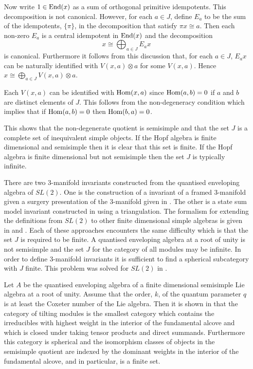 Now write $1\in\operatorname{End} (x)$ as a sum of orthogonal primitive idempotents.
This decomposition is not canonical. However, for each $a\in J$, define
$E_a$ to be the sum of the idempotents, $\{\pi\}$, in the decomposition
that satisfy $\pi x\cong a$. Then each non-zero $E_a$ is a central
idempotent in $\operatorname{End} (x)$ and the decomposition
$$x\cong\bigoplus_{a\in J}E_ax$$
is canonical. Furthermore it follows from this discussion that, for each
$a\in J$, $E_ax$ can be naturally identified with $V(x,a)\otimes a$ for
some $V(x,a)$. Hence $x\cong\bigoplus_{a\in J}V(x,a)\otimes a$. 

Each $V(x,a)$ can be identified with $\operatorname{Hom} (x,a)$ since $\operatorname{Hom} (a,b)=0$ 
if $a$ and $b$ are distinct elements of $J$. This follows from the 
non-degeneracy condition which implies that if $\operatorname{Hom}(a,b)=0$ then 
$\operatorname{Hom}(b,a)=0$.
\enddemo

This shows that the non-degenerate quotient is semisimple and that the set
$J$ is a complete set of inequivalent simple objects. If the Hopf algebra
is finite dimensional and semisimple then it is clear that this set is
finite. If the Hopf algebra is finite dimensional but not semisimple then
the set $J$ is typically infinite.

There are two 3-manifold invariants constructed from the quantised
enveloping algebra of $SL(2)$. One is the construction of a invariant
of a framed 3-manifold given a surgery presentation of the 3-manifold
given in \cite{Reshetikhin and Turaev  1991}. The other is a state sum model invariant
constructed in \cite{Turaev and Viro  1992}  using a triangulation. The formalism for
extending the definitions from $SL(2)$ to other finite dimensional simple
algebras is given in \cite{Turaev  1992}  and \cite{Barrett and Westbury 1996}.
Each of these approaches
encounters the same difficulty which is that the set $J$ is required to be
finite. A quantised enveloping algebra at a root of unity is not
semisimple and the set $J$ for the category of all  
modules may be infinite. In order to define 3-manifold invariants it
is sufficient to find a spherical subcategory with $J$ finite.
This problem was solved for $SL(2)$ in \cite{Reshetikhin and Turaev  1991}. 

Let $A$ be the quantised enveloping algebra of a finite dimensional
semisimple Lie algebra at a root of unity. Assume that the order, $k$, of
the quantum parameter $q$ is at least the Coxeter number of the Lie
algebra. Then it is shown in \cite{Andersen and Paradowski 1995}  
that the category of tilting modules is the smallest category which
contains the irreducibles with highest weight in the interior of the
fundamental alcove and which is closed under taking tensor products and
direct summands. Furthermore this category is spherical and the isomorphism
classes of objects in the semisimple quotient are indexed by the dominant
weights in the interior of the fundamental alcove, and in particular, is
a finite set.

